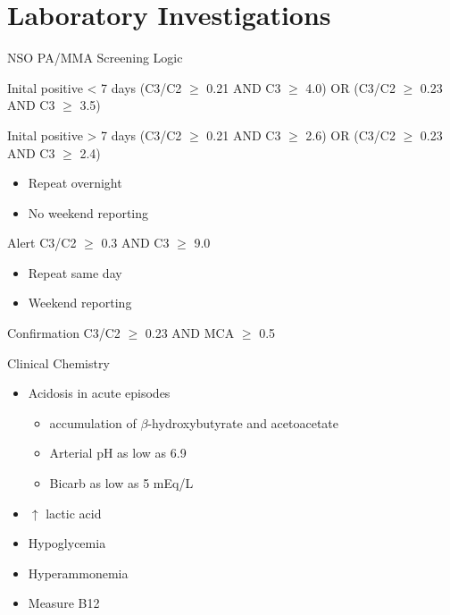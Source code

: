 \documentclass[presentation, smaller]{beamer}
\begin{document}
\section{Laboratory Investigations}
\label{sec:orgheadline17}
\begin{frame}[label={sec:orgheadline12}]{NSO PA/MMA Screening Logic}
\begin{block}{Inital positive \textless{} 7 days}
(C3/C2 \(\ge\) 0.21 AND C3 \(\ge\) 4.0)
OR
(C3/C2 \(\ge\) 0.23 AND C3 \(\ge\) 3.5)
\end{block}
\begin{block}{Inital positive \textgreater{} 7 days}
(C3/C2 \(\ge\) 0.21 AND C3 \(\ge\) 2.6)
OR
(C3/C2 \(\ge\) 0.23 AND C3 \(\ge\) 2.4)
\begin{itemize}
\item Repeat overnight
\item No weekend reporting
\end{itemize}
\end{block}
\begin{block}{Alert}
C3/C2 \(\ge\) 0.3 AND C3 \(\ge\) 9.0
\begin{itemize}
\item Repeat same day
\item Weekend reporting
\end{itemize}
\end{block}
\begin{block}{Confirmation}
C3/C2 \(\ge\) 0.23 AND MCA \(\ge\) 0.5
\end{block}
\end{frame}

\begin{frame}[label={sec:orgheadline13}]{Clinical Chemistry}
\begin{itemize}
\item Acidosis in acute episodes
\begin{itemize}
\item accumulation of \(\beta\)-hydroxybutyrate and acetoacetate
\item Arterial pH as low as 6.9
\item Bicarb as low as 5 mEq/L
\end{itemize}
\item \(\uparrow\) lactic acid
\item Hypoglycemia
\item Hyperammonemia
\item Measure B12
\end{itemize}
\end{frame}
\end{document}
